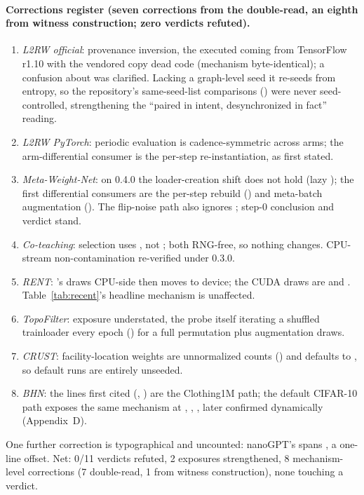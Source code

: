 \paragraph{Corrections register (seven corrections from the double-read,
an eighth from witness construction; zero verdicts refuted).}
\begin{enumerate}\itemsep2pt
\item \emph{L2RW official}: provenance inversion, the executed 
coming from TensorFlow r1.10 with the vendored copy dead code (mechanism
byte-identical); a confusion about  was clarified. Lacking a graph-level seed
it re-seeds from entropy, so the repository's same-seed-list comparisons
() were never seed-controlled, strengthening
the ``paired in intent, desynchronized in fact'' reading.
\item \emph{L2RW PyTorch}: periodic evaluation is cadence-symmetric across
arms; the arm-differential consumer is the per-step re-instantiation, as first
stated.
\item \emph{Meta-Weight-Net}: on  0.4.0 the loader-creation
 shift does not hold (lazy ); the first
differential consumers are the per-step rebuild () and meta-batch
augmentation (). The flip-noise path also ignores ;
step-0 conclusion and verdict stand.
\item \emph{Co-teaching}: selection uses , not
; both RNG-free, so nothing changes. CPU-stream
non-contamination re-verified under  0.3.0.
\item \emph{RENT}: 's  draws CPU-side then moves
to device; the CUDA draws are  and .
Table~\ref{tab:recent}'s headline mechanism is unaffected.
\item \emph{TopoFilter}: exposure understated, the probe itself iterating a
shuffled trainloader every epoch () for a full permutation plus
augmentation draws.
\item \emph{CRUST}: facility-location weights are unnormalized counts
() and  defaults to , so default runs are
entirely unseeded.
\item \emph{BHN}: the lines first cited (, ) are
the Clothing1M path; the default CIFAR-10 path exposes the same mechanism at
, , , later confirmed dynamically
(Appendix~D).
\end{enumerate}
One further correction is typographical and uncounted: nanoGPT's
 spans , a one-line offset. Net:
0/11 verdicts refuted, 2 exposures strengthened, 8 mechanism-level corrections
(7 double-read, 1 from witness construction), none touching a verdict.

